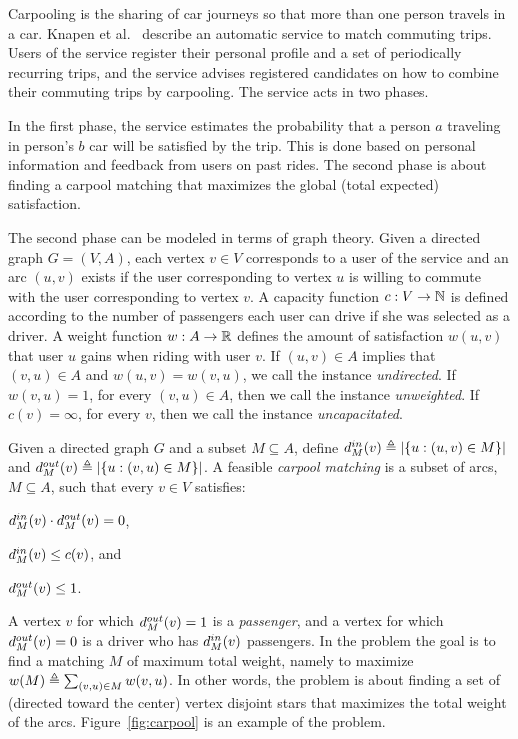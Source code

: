 Carpooling is the sharing of car journeys so that more than one
person travels in a car.  Knapen et al.~\cite{knapen2013estimating}
describe an automatic service to match commuting trips.  Users of the
service register their personal profile and a set of periodically
recurring trips, and the service advises registered candidates on how
to combine their commuting trips by carpooling.  The service acts in
two phases.

In the first phase, the service estimates the probability that a person $a$
traveling in person's $b$ car will be satisfied by the trip.
This is done based on personal information and feedback from users on past
rides.
The second phase is about finding a carpool matching
that maximizes the global (total expected) satisfaction.

The second phase can be modeled in terms of graph theory.  Given a
directed graph $G = (V, A)$, each vertex $v \in V$ corresponds to a
user of the service and an arc $(u, v)$ exists if the user
corresponding to vertex $u$ is willing to commute with the user
corresponding to vertex $v$.  A capacity function $ c:
V \rightarrow \N $ is defined according to the number of passengers
each user can drive if she was selected as a driver.  A weight
function $w : A \rightarrow \R $ defines the amount of satisfaction
$w(u, v)$ that user $u$ gains when riding with user $v$.
%
If $(u,v) \in A$ implies that $(v,u) \in A$ and $w(u,v) = w(v,u)$, we
call the instance \emph{undirected}.  If $w(v,u) = 1$, for every
$(v,u) \in A$, then we call the instance
\emph{unweighted}.  If $c(v) = \infty$, for every $v$, then we
call the instance \emph{uncapacitated}.

Given a directed graph $G$ and a subset $M \subseteq A$, define
$\din[M](v) \eqdf \abs{\set{u :(u,v) \in M}}$ and
$\dout[M](v) \eqdf \abs{\set{u :(v,u) \in M}}$.
%
A feasible \emph{carpool matching} is a subset of arcs, $M \subseteq
A$, such that every $v \in V$ satisfies:
\begin{inparaenum}[(i)]
\item $\din[M](v) \cdot \dout[M](v) = 0$,
\item $\din[M](v) \leq c(v)$, and 
\item $\dout[M](v) \leq 1$.
\end{inparaenum}
A vertex $v$ for which $\dout[M](v) = 1$ is a \emph{passenger}, and a
vertex for which $\dout[M](v) = 0$ is a driver who has $\din[M](v)$
passengers.  In the \carpool problem the goal is to find a matching
$M$ of maximum total weight, namely to maximize
$w(M) \eqdf \sum_{(v,u) \in M} w(v,u)$.  In other words, the \carpool
problem is about finding a set of (directed toward the center) vertex
disjoint stars that maximizes the total weight of the arcs.
Figure~\ref{fig:carpool} is an example of the \carpool problem.

